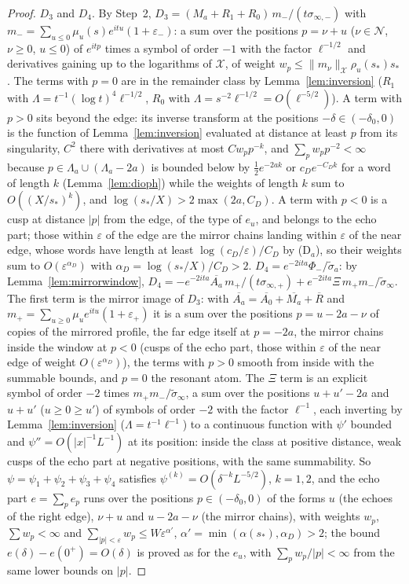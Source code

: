 \documentclass[11pt]{article}
\theoremstyle{definition}
\theoremstyle{remark}
\begin{document}
\begin{proof}
$D_3$ and $D_4$. By Step~2, $D_3=(M_a+R_1+R_0)\,m_-/(t\sigma_{\infty,-})$ with $m_-=\sum_{u\le0}\mu_u(s)e^{itu}(1+\varepsilon_-)$: a sum over the positions $p=\nu+u$ ($\nu\in\mathcal N$, $\nu\ge0$, $u\le0$) of $e^{itp}$ times a symbol of order $-1$ with the factor $\ell^{-1/2}$ and derivatives gaining up to the logarithms of $\mathcal X$, of weight $w_p\le\|m_\nu\|_{\mathcal X}\rho_u(s_*)s_*$. The terms with $p=0$ are in the remainder class by Lemma~\ref{lem:inversion} ($R_1$ with $\Lambda=t^{-1}(\log t)^4\ell^{-1/2}$, $R_0$ with $\Lambda=s^{-2}\ell^{-1/2}=O(\ell^{-5/2})$). A term with $p>0$ sits beyond the edge: its inverse transform at the positions $-\delta\in(-\delta_0,0)$ is the function of Lemma~\ref{lem:inversion} evaluated at distance at least $p$ from its singularity, $C^2$ there with derivatives at most $Cw_pp^{-k}$, and $\sum_pw_pp^{-2}<\infty$ because $p\in\Lambda_a\cup(\Lambda_a-2a)$ is bounded below by $\tfrac12e^{-2ak}$ or $c_De^{-C_Dk}$ for a word of length $k$ (Lemma~\ref{lem:dioph}) while the weights of length $k$ sum to $O((X/s_*)^k)$, and $\log(s_*/X)>2\max(2a,C_D)$. A term with $p<0$ is a cusp at distance $|p|$ from the edge, of the type of $e_u$, and belongs to the echo part; those within $\varepsilon$ of the edge are the mirror chains landing within $\varepsilon$ of the near edge, whose words have length at least $\log(c_D/\varepsilon)/C_D$ by (D$_a$), so their weights sum to $O(\varepsilon^{\alpha_D})$ with $\alpha_D=\log(s_*/X)/C_D>2$. $D_4=e^{-2ita}\Phi_-/\tilde\sigma_a$: by Lemma~\ref{lem:mirrorwindow}, $D_4=-e^{-2ita}\overline{A_a}\,m_+/(t\sigma_{\infty,+})+e^{-2ita}\Xi\,m_+m_-/\tilde\sigma_\infty$. The first term is the mirror image of $D_3$: with $\overline{A_a}=\overline{A_0}+\overline{M_a}+\overline R$ and $m_+=\sum_{u\ge0}\mu_ue^{itu}(1+\varepsilon_+)$ it is a sum over the positions $p=u-2a-\nu$ of copies of the mirrored profile, the far edge itself at $p=-2a$, the mirror chains inside the window at $p<0$ (cusps of the echo part, those within $\varepsilon$ of the near edge of weight $O(\varepsilon^{\alpha_D})$), the terms with $p>0$ smooth from inside with the summable bounds, and $p=0$ the resonant atom. The $\Xi$ term is an explicit symbol of order $-2$ times $m_+m_-/\tilde\sigma_\infty$, a sum over the positions $u+u'-2a$ and $u+u'$ ($u\ge0\ge u'$) of symbols of order $-2$ with the factor $\ell^{-1}$, each inverting by Lemma~\ref{lem:inversion} ($\Lambda=t^{-1}\ell^{-1}$) to a continuous function with $\psi'$ bounded and $\psi''=O(|x|^{-1}L^{-1})$ at its position: inside the class at positive distance, weak cusps of the echo part at negative positions, with the same summability. So $\psi=\psi_1+\psi_2+\psi_3+\psi_4$ satisfies $\psi^{(k)}=O(\delta^{-k}L^{-5/2})$, $k=1,2$, and the echo part $e=\sum_pe_p$ runs over the positions $p\in(-\delta_0,0)$ of the forms $u$ (the echoes of the right edge), $\nu+u$ and $u-2a-\nu$ (the mirror chains), with weights $w_p$, $\sum w_p<\infty$ and $\sum_{|p|<\varepsilon}w_p\le W\varepsilon^{\alpha'}$, $\alpha'=\min(\alpha(s_*),\alpha_D)>2$; the bound $e(\delta)-e(0^+)=O(\delta)$ is proved as for the $e_u$, with $\sum_pw_p/|p|<\infty$ from the same lower bounds on $|p|$.


\end{proof}
\end{document}
